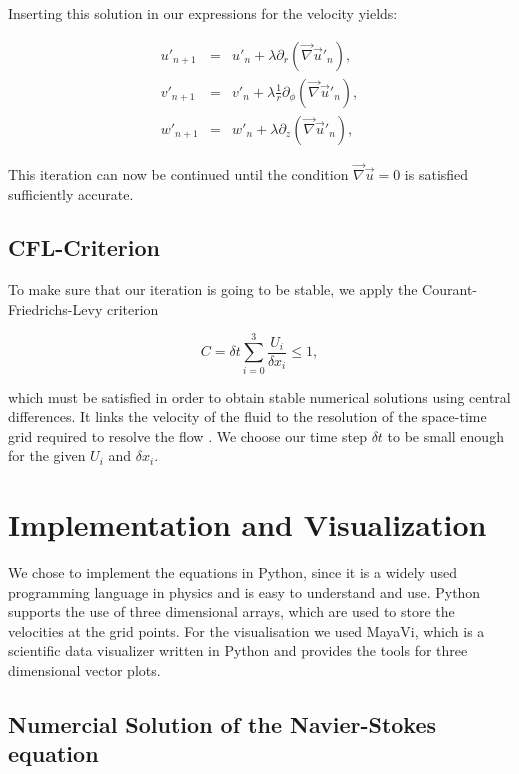 \documentclass[12pt, a4paper]{article} %
\begin{document}
		Inserting this solution in our expressions for the velocity yields:
		
		\begin{eqnarray}
			u'_{n+1} &=& u'_n + \lambda \partial_r (\vec{\nabla}\vec{u}'_n), \\
			v'_{n+1} &=& v'_n + \lambda \frac{1}{r} \partial_\phi (\vec{\nabla}\vec{u}'_n), \\
			w'_{n+1} &=& w'_n + \lambda \partial_z (\vec{\nabla}\vec{u}'_n),
			\label{eq:Drucknachregelung uvw}
		\end{eqnarray}
		
		This iteration can now be continued until the condition $\vec{\nabla}\vec{u}=0$ is satisfied sufficiently accurate. 
	
	\subsection{CFL-Criterion} %
		To make sure that our iteration is going to be stable, we apply the Courant-Friedrichs-Levy criterion
		
		\begin{equation}
			C = \delta t \sum_{i=0}^3 \frac{U_i}{\delta x_i} \leq 1 ,
			\label{eq:CFL}
		\end{equation}
		 
		which must be satisfied in order to obtain stable numerical solutions using central differences. It links the velocity of the fluid to the resolution of the space-time grid required to resolve the flow \cite{Stocker2009}.
		We choose our time step $\delta t$ to be small enough for the given $U_i$ and $\delta x_i$.
		
		
	\newpage
\section{Implementation and Visualization}

	We chose to implement the equations in Python, since it is a widely used programming language in physics and is easy to understand and use. Python supports the use of three dimensional arrays, which are used to store the velocities at the grid points. For the visualisation we used MayaVi, which is a scientific data visualizer written in Python and provides the tools for three dimensional vector plots.

	\subsection{Numercial Solution of the Navier-Stokes equation}
		
\end{document}
